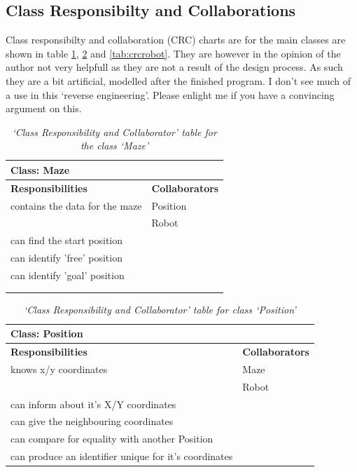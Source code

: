 \documentclass[a4paper,11pt,twoside]{article}
\begin{document}
\subsection{Class Responsibilty and Collaborations}
Class responsibilty and collaboration (CRC) charts are for the main
classes are shown in table \ref{tab:crcmaze}, \ref{tab:crcposi} and
\ref{tab:crcrobot}. They are however in the opinion of the author not
very helpfull as they are not a result of the design process. As such
they are a bit artificial, modelled after the finished program. I
don't see much of a use in this `reverse engineering'. Please enlight
me if you have a convincing argument on this.

\begin{table}[]
\centering
\caption{\textit{`Class Responsibility and Collaborator' table for the
    class `Maze'}}
\label{tab:crcmaze}
\begin{tabular}{l|l}
Class: Maze                    &                        \\ \hline
\textbf{Responsibilities}      & \textbf{Collaborators} \\
contains the data for the maze & Position               \\
                               & Robot                  \\
can find the start position    &                        \\
can identify 'free' position   &                        \\
can identify 'goal' position   &                        \\
                               &                        \\
                               &                       
\end{tabular}
\end{table}

\begin{table}[]
\centering
\caption{\textit{`Class Responsibility and Collaborator' table for
    class `Position'}}
\label{tab:crcposi}
\begin{tabular}{l|l}
Class: Position                                       &
\\ \hline
\textbf{Responsibilities}                             &
\textbf{Collaborators} \\
knows x/y coordinates                                 & Maze
\\
                                                      & Robot
                                                      \\
can inform about it's X/Y coordinates                 &
\\
can give the neighbouring coordinates                 &
\\
can compare for equality with another Position        &
\\
can produce an identifier unique for it's coordinates &                       
\end{tabular}
\end{table}
\end{document}
